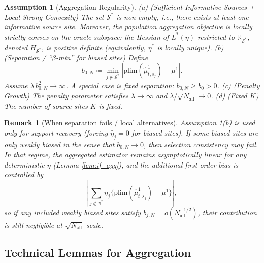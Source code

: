 \documentclass{article}
\newtheorem{assumption}{Assumption}[section]
\newtheorem{remark}{Remark}[section]
\begin{document}
\begin{assumption}[Aggregation Regularity]\label{asmp:aggregation}
(a) (Sufficient Informative Sources + Local Strong Convexity) The set $\mathcal{S}^*$ is non-empty, i.e., there exists at least one informative source site. Moreover, the population aggregation objective is locally strictly convex on the oracle subspace: the Hessian of $L^*(\eta)$ restricted to $\mathbb{R}_{\mathcal{S}^*}$, denoted $H_{\mathcal{S}^*}$, is positive definite (equivalently, $\eta^*$ is locally unique).
(b) (Separation / ``$\beta$-min'' for biased sites) Define
\[
b_{0,N} \coloneqq \min_{j\notin\mathcal{S}^*}\left|\text{plim}(\widehat{\mu}^1_{t,s_j}) - \mu^1\right|.
\]
Assume $\lambda\,b_{0,N}^2\to\infty$. A special case is \emph{fixed separation}: $b_{0,N}\ge b_0>0$.
(c) (Penalty Growth) The penalty parameter satisfies $\lambda \to \infty$ and $\lambda / \sqrt{N_{\mathrm{all}}} \to 0$.
(d) (Fixed $K$) The number of source sites $K$ is fixed.
\end{assumption}

\begin{remark}[When separation fails / local alternatives]\label{rem:weak_bias}
Assumption \ref{asmp:aggregation}(b) is used only for \emph{support recovery} (forcing $\widehat{\eta}_j=0$ for biased sites). If some biased sites are only \emph{weakly} biased in the sense that $b_{0,N}\to 0$, then selection consistency may fail. In that regime, the aggregated estimator remains asymptotically linear for any deterministic $\eta$ (Lemma \ref{lem:if_agg}), and the additional first-order bias is controlled by
\[
\left|\sum_{j\notin\mathcal{S}^*}\eta_j\{\text{plim}(\widehat{\mu}^1_{t,s_j})-\mu^1\}\right|,
\]
so if any included weakly biased sites satisfy $b_{j,N}=o(N_{\mathrm{all}}^{-1/2})$, their contribution is still negligible at $\sqrt{N_{\mathrm{all}}}$ scale.
\end{remark}

\subsection{Technical Lemmas for Aggregation}
\end{document}
